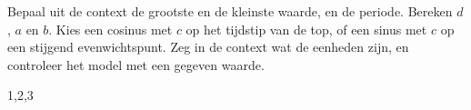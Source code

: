 \begin{werkwijze}
Bepaal uit de context de grootste en de kleinste waarde, en de periode. Bereken $d$, $a$ en $b$. Kies een cosinus met $c$ op het tijdstip van de top, of een sinus met $c$ op een stijgend evenwichtspunt. Zeg in de context wat de eenheden zijn, en controleer het model met een gegeven waarde.
\end{werkwijze}

\begin{oefeningen}

\end{oefeningen}

\opdrachtenkop

\begin{oefeningen}


















\begin{alleenvoor}{1,2,3}

\end{alleenvoor}








\end{oefeningen}

